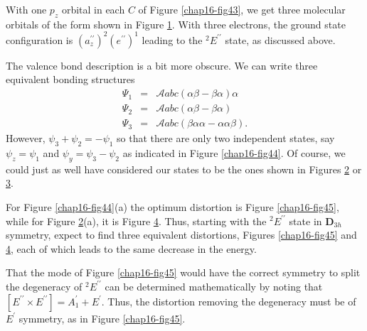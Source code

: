 \begin{figure}
\caption{}
\label{chap16-fig49}
\end{figure}

With one $p_z$ orbital in each $C$ of Figure \ref{chap16-fig43}, we
get three molecular orbitals of the form shown in Figure
\ref{chap16-fig49}.  With three electrons, the ground state
configuration is $( a^{\prime\prime}_z)^2 ( e^{\prime\prime} )^1$
leading to the $^2E^{\prime\prime}$ state, as discussed above.

The valence bond description is a bit more obscure.  We can write three 
equivalent bonding structures
\begin{eqnarray}
\Psi_1 &=& \mathcal{A}abc ( \alpha \beta - \beta \alpha )\alpha\\
\Psi_2 &=& \mathcal{A}abc ( \alpha \beta - \beta \alpha )\\
\Psi_3 &=& \mathcal{A}abc ( \beta \alpha \alpha - \alpha \alpha \beta).
\end{eqnarray}
However, $\psi_3 + \psi_2 = - \psi_1$ so that there are only two
independent states, say $\psi_z = \psi_1$ and $\psi_y = \psi_3 -
\psi_2$ as indicated in Figure \ref{chap16-fig44}.  Of course, we
could just as well have considered our states to be the ones shown in
Figures \ref{chap16-fig50} or \ref{chap16-fig51}.

\begin{figure}
\caption{}
\label{chap16-fig50}
\end{figure}

\begin{figure}
\caption{}
\label{chap16-fig51}
\end{figure}

\begin{figure}
\caption{}
\label{chap16-fig52}
\end{figure}

For Figure \ref{chap16-fig44}(a) the optimum distortion is Figure
\ref{chap16-fig45}, while for Figure \ref{chap16-fig50}(a), it is
Figure \ref{chap16-fig52}.  Thus, starting with the
$^2E^{\prime\prime}$ state in {\bf D}$_{3h}$ symmetry, expect to find
three equivalent distortions, Figures \ref{chap16-fig45} and
\ref{chap16-fig52}, each of which leads to the same decrease in the
energy.

That the mode of Figure \ref{chap16-fig45} would have the correct
symmetry to split the degeneracy of $^2E^{\prime\prime}$ can be
determined mathematically by noting that $[ E^{\prime\prime} \times
E^{\prime\prime} ] = A^{\prime}_1 + E^{\prime}$.  Thus, the distortion
removing the degeneracy must be of $E^{\prime}$ symmetry, as in Figure
\ref{chap16-fig45}.

